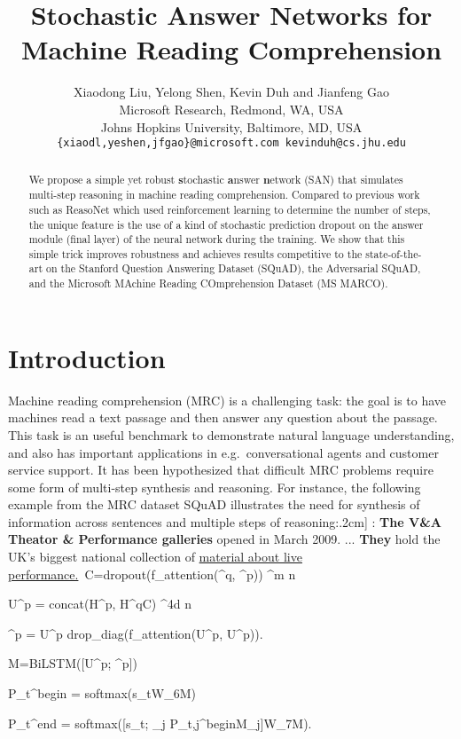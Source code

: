\documentclass[11pt,a4paper]{article}
\title{Stochastic Answer Networks for Machine Reading Comprehension}
\author{Xiaodong Liu, Yelong Shen, Kevin Duh and Jianfeng Gao \\
      
  Microsoft Research, Redmond, WA, USA \\
  
  Johns Hopkins University, Baltimore, MD, USA \\
  {\tt \{xiaodl,yeshen,jfgao\}@microsoft.com
   kevinduh@cs.jhu.edu}
}
\date{}
\begin{document}
\maketitle
\begin{abstract}
We propose a simple yet robust \textbf{s}tochastic \textbf{a}nswer \textbf{n}etwork (SAN) that simulates multi-step reasoning in machine reading comprehension. 
Compared to previous work such as ReasoNet which used reinforcement learning to determine the number of steps, the unique feature is the use of a kind of stochastic prediction dropout on the answer module (final layer) of the neural network during the training. 
We show that this simple trick improves robustness and achieves results competitive to the state-of-the-art on the Stanford Question Answering Dataset (SQuAD), the Adversarial SQuAD, and the Microsoft MAchine Reading COmprehension Dataset (MS MARCO).
\end{abstract}

\section{Introduction}
\label{sec:intro}
Machine reading comprehension (MRC) is a challenging task: the goal is to have machines read a text passage and then answer any question about the passage.
This task is an useful benchmark to demonstrate natural language understanding, and also has important applications in e.g.~conversational agents and customer service support.
It has been hypothesized that difficult MRC problems require some form of multi-step synthesis and reasoning. 
For instance, the following example from the MRC dataset SQuAD \cite{rajpurkar2016squad} illustrates the need for synthesis of information across sentences and multiple steps of reasoning:\0.2cm]
: \textbf{The V\&A Theator \& Performance galleries} opened in March 2009. ... \textbf{They} hold the UK's biggest national collection of \underline{material about live performance.}\
C=dropout(f_{attention}(^q, ^p)) \in {}^{m \times n}\\
\label{eq:align}

U^p = concat(H^p, H^qC) \in {}^{4d \times n}
\label{eq:gather}

^p = U^p drop_{diag}(f_{attention}(U^p, U^p)).
\label{eq:self}

M=BiLSTM([U^p; ^p])
\label{eq:mem}

P_t^{begin} = softmax(s_tW_6M)
\label{eq:begin}

P_t^{end} = softmax([s_t; \sum_j P_{t,j}^{begin}M_j]W_7M).
\label{eq:end}
\end{document}
